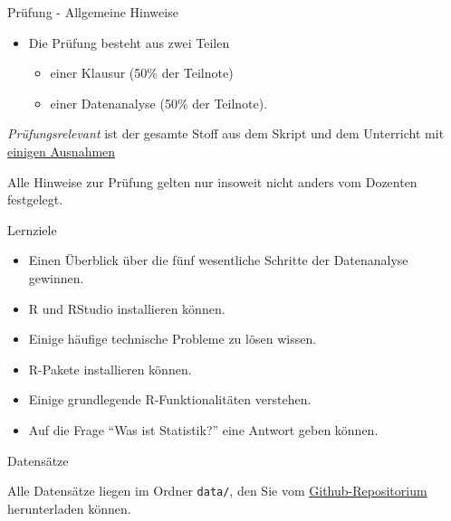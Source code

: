 \begin{frame}{Prüfung - Allgemeine Hinweise}

\begin{itemize}
\tightlist
\item
  Die Prüfung besteht aus zwei Teilen

  \begin{itemize}
  \tightlist
  \item
    einer Klausur (50\% der Teilnote)
  \item
    einer Datenanalyse (50\% der Teilnote).
  \end{itemize}
\end{itemize}

\emph{Prüfungsrelevant} ist der gesamte Stoff aus dem Skript und dem
Unterricht mit
\href{https://sebastiansauer.github.io/Praxis_der_Datenanalyse/organisatorisches.html\#prufung}{einigen
Ausnahmen}

Alle Hinweise zur Prüfung gelten nur insoweit nicht anders vom Dozenten
festgelegt.

\end{frame}

\begin{frame}{Lernziele}

\begin{itemize}
\tightlist
\item
  Einen Überblick über die fünf wesentliche Schritte der Datenanalyse
  gewinnen.
\item
  R und RStudio installieren können.
\item
  Einige häufige technische Probleme zu lösen wissen.
\item
  R-Pakete installieren können.
\item
  Einige grundlegende R-Funktionalitäten verstehen.
\item
  Auf die Frage ``Was ist Statistik?'' eine Antwort geben können.
\end{itemize}

\end{frame}

\begin{frame}[fragile]{Datensätze}

Alle Datensätze liegen im Ordner \texttt{data/}, den Sie vom
\href{https://github.com/sebastiansauer/Praxis_der_Datenanalyse}{Github-Repositorium}
herunterladen können.

\end{frame}

